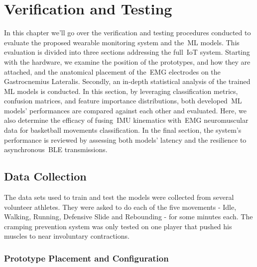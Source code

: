 


\chapter{Verification and Testing}
\label{cha:verificaton_testing}

In this chapter we'll go over the verification and testing procedures conducted to evaluate the proposed wearable monitoring system and the~\gls{ML} models. This evaluation is divided into three sections addressing the full~\gls{IoT} system.
Starting with the hardware, we examine the position of the prototypes, and how they are attached, and the anatomical placement of the~\gls{EMG} electrodes on the Gastrocnemius Lateralis. Secondly, an in-depth statistical analysis of the trained 
\gls{ML} models is conducted. In this section, by leveraging classification metrics, confusion matrices, and feature importance distributions, both developed~\gls{ML} models' performances are compared against each other and evaluated. Here, 
we also determine the efficacy of fusing~\gls{IMU} kinematics with~\gls{EMG} neuromuscular data for basketball movements classification. In the final section, the system's performance is reviewed by assessing both models' latency and the resilience 
to asynchronous~\gls{BLE} transmissions.



\section{Data Collection}
\label{sec:data_collection}

The data sets used to train and test the models were collected from several volunteer athletes. They were asked to do each of the five movements - Idle, Walking, Running, Defensive Slide and Rebounding - for some minutes 
each. The cramping prevention system was only tested on one player that pushed his muscles to near involuntary contractions.


\subsection{Prototype Placement and Configuration}
\label{ssec:prototype_placement}


